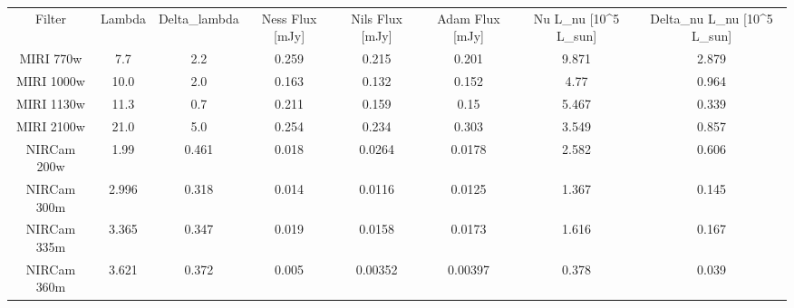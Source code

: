 \begin{table}
\begin{tabular}{cccccccc}
Filter & Lambda & Delta_lambda & Ness Flux [mJy] & Nils Flux [mJy] & Adam Flux [mJy] & Nu L_nu [10^5 L_sun] & Delta_nu L_nu [10^5 L_sun] \\
MIRI 770w & 7.7 & 2.2 & 0.259 & 0.215 & 0.201 & 9.871 & 2.879 \\
MIRI 1000w & 10.0 & 2.0 & 0.163 & 0.132 & 0.152 & 4.77 & 0.964 \\
MIRI 1130w & 11.3 & 0.7 & 0.211 & 0.159 & 0.15 & 5.467 & 0.339 \\
MIRI 2100w & 21.0 & 5.0 & 0.254 & 0.234 & 0.303 & 3.549 & 0.857 \\
NIRCam 200w & 1.99 & 0.461 & 0.018 & 0.0264 & 0.0178 & 2.582 & 0.606 \\
NIRCam 300m & 2.996 & 0.318 & 0.014 & 0.0116 & 0.0125 & 1.367 & 0.145 \\
NIRCam 335m & 3.365 & 0.347 & 0.019 & 0.0158 & 0.0173 & 1.616 & 0.167 \\
NIRCam 360m & 3.621 & 0.372 & 0.005 & 0.00352 & 0.00397 & 0.378 & 0.039 \\
\end{tabular}
\end{table}
